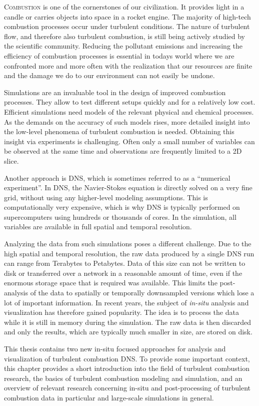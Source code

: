 \lettrine[findent=-2pt, nindent=2pt, lhang=0.05, loversize=0.02]{C}{ombustion}
is one of the cornerstones of our civilization.
%
It provides light in a candle or carries objects into space in a rocket engine.
%
The majority of high-tech combustion processes occur under turbulent conditions.
%
The nature of turbulent flow, and therefore also turbulent combustion, is still
being actively studied by the scientific community.
%
Reducing the pollutant emissions and increasing the efficiency of combustion
processes is essential in todays world where we are confronted more and more
often with the realization that our resources are finite and the damage we do to
our environment can not easily be undone.
%

%
Simulations are an invaluable tool in the design of improved combustion
processes.
%
They allow to test different setups quickly and for a relatively low cost.
%
Efficient simulations need models of the relevant physical and chemical
processes.
%
As the demands on the accuracy of such models rises, more detailed insight into
the low-level phenomena of turbulent combustion is needed.
%
Obtaining this insight via experiments is challenging.
%
Often only a small number of variables can be observed at the same time and
observations are frequently limited to a \ac{2D} slice.
%

%
Another approach is \acf{DNS}, which is sometimes referred to as a ``numerical
experiment''.
%
In \ac{DNS}, the Navier-Stokes equation is directly solved on a very fine grid,
without using any higher-level modeling assumptions.
%
This is computationally very expensive, which is why \ac{DNS} is typically
performed on supercomputers using hundreds or thousands of cores.
%
In the simulation, all variables are available in full spatial and temporal
resolution.
%

%
Analyzing the data from such simulations poses a different challenge.
%
Due to the high spatial and temporal resolution, the raw data produced by a
single \ac{DNS} run can range from Terabytes to Petabytes.
%
Data of this size can not be written to disk or transferred over a network in a
reasonable amount of time, even if the enormous storage space that is required
was available.
%
This limits the post-analysis of the data to spatially or temporally downsampled
versions which lose a lot of important information.
%
In recent years, the subject of \emph{in-situ} analysis and visualization has
therefore gained popularity.
%
The idea is to process the data while it is still in memory during the
simulation.
%
The raw data is then discarded and only the results, which are typically much
smaller in size, are stored on disk.
%

%
This thesis contains two new in-situ focused approaches for analysis and
visualization of turbulent combustion \ac{DNS}.
%
To provide some important context, this chapter provides a short introduction
into the field of turbulent combustion research, the basics of turbulent
combustion modeling and simulation, and an overview of relevant research
concerning in-situ and post-processing of turbulent combustion data in
particular and large-scale simulations in general.
%